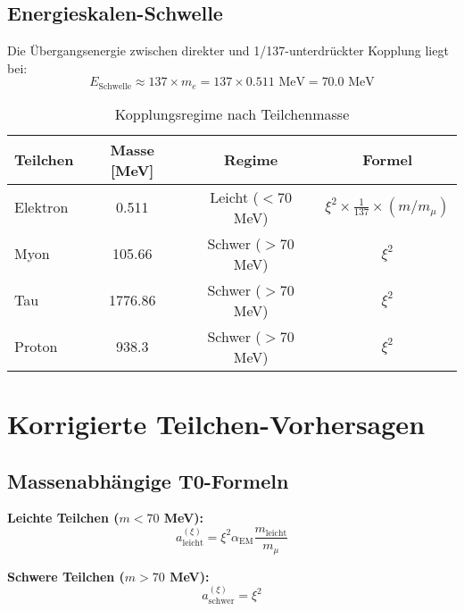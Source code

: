 \documentclass[12pt,a4paper]{article}
\newcommand{\xipar}{\xi}
\newcommand{\alphaEM}{\alpha_{\text{EM}}}
\begin{document}
	\subsection{Energieskalen-Schwelle}
	
	Die Übergangsenergie zwischen direkter und 1/137-unterdrückter Kopplung liegt bei:
	\begin{equation}
		E_{\text{Schwelle}} \approx 137 \times m_e = 137 \times 0.511 \text{ MeV} = 70.0 \text{ MeV}
	\end{equation}
	
	\begin{table}[H]
		\centering
		\caption{Kopplungsregime nach Teilchenmasse}
		\begin{tabular}{@{}lccc@{}}
			\toprule
			\textbf{Teilchen} & \textbf{Masse [MeV]} & \textbf{Regime} & \textbf{Formel} \\
			\midrule
			\rowcolor{yellow!20}
			Elektron & 0.511 & Leicht ($< 70$ MeV) & $\xipar^2 \times \frac{1}{137} \times (m/m_\mu)$ \\
			\rowcolor{blue!10}
			Myon & 105.66 & Schwer ($> 70$ MeV) & $\xipar^2$ \\
			\rowcolor{blue!10}
			Tau & 1776.86 & Schwer ($> 70$ MeV) & $\xipar^2$ \\
			\rowcolor{blue!10}
			Proton & 938.3 & Schwer ($> 70$ MeV) & $\xipar^2$ \\
			\bottomrule
		\end{tabular}
	\end{table}
	
	\section{Korrigierte Teilchen-Vorhersagen}
	
	\subsection{Massenabhängige T0-Formeln}
	
	\begin{formel}
		\textbf{Leichte Teilchen ($m < 70$ MeV):}
		\begin{equation}
			a_{\text{leicht}}^{(\xipar)} = \xipar^2 \alphaEM \frac{m_{\text{leicht}}}{m_\mu}
		\end{equation}
		
		\textbf{Schwere Teilchen ($m > 70$ MeV):}
		\begin{equation}
			a_{\text{schwer}}^{(\xipar)} = \xipar^2
		\end{equation}
	\end{formel}
	
\end{document}
